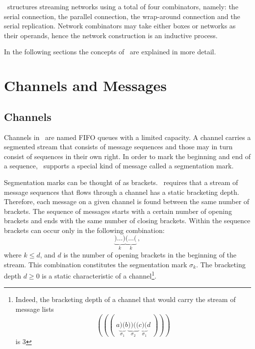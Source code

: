 \ak\ structures streaming networks using a total of four combinators, namely: the serial connection, the parallel connection, the wrap-around connection and the serial replication. Network combinators may take either boxes or networks as their operands, hence the network construction is an inductive process. 

In the following sections the concepts of \ak\ are explained in more detail.


\section{Channels and Messages}
    \subsection*{Channels}
Channels in \ak\ are named FIFO queues with a limited capacity. A channel carries a segmented stream that consists of message sequences and those may in turn consist of sequences in their own right. In order to mark the beginning and end of a sequence, \ak\ supports a special kind of message called a segmentation mark.

Segmentation marks can be thought of as brackets. \ak\ requires that a stream of message sequences that flows through a channel has a static bracketing depth. Therefore, each message on a given channel is found between the same number of brackets. The sequence of messages starts with a certain number of opening brackets and ends with the same number of closing brackets. Within the sequence brackets can occur only in the following combination:
\[
\underbrace{)\ldots)}_k \underbrace{(\ldots(}_k\,,
\]
where $k \le d$, and $d$ is the number of opening brackets in the beginning of the stream. This combination constitutes the segmentation mark $\sigma_k$. The bracketing depth $d \ge 0$ is a static characteristic of a channel\footnote{Indeed, the bracketing depth of a channel that would carry the stream of message lists
\[
(((\;a\underbrace{)(}_{\sigma_1}b\underbrace{))((}_{\sigma_2}c\underbrace{)(}_{\sigma_1}d\;)))
\]
is 3}.

